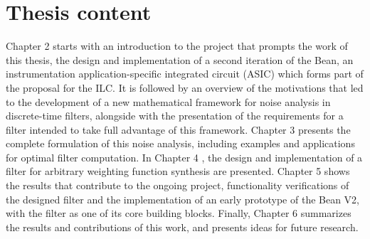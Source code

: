 \section{Thesis content}
Chapter 2 starts with an introduction to the project that prompts the work of this thesis, the design and implementation of a second iteration of the Bean, an instrumentation application-specific integrated circuit (ASIC) which forms part of the proposal for the ILC. It is followed by an overview of the motivations that led to the development of a new mathematical framework for noise analysis in discrete-time filters, alongside with the presentation of the requirements for a filter intended to take full advantage of this framework. Chapter 3 presents the complete formulation of this noise analysis, including examples and applications for optimal filter computation. In Chapter 4 , the design and implementation of a filter for arbitrary weighting function synthesis are presented. Chapter 5 shows the results that contribute to the ongoing project, functionality verifications of the designed filter and the implementation of an early prototype of the Bean V2, with the filter as one of its core building blocks. Finally, Chapter 6 summarizes the results and contributions of this work, and presents ideas for future research.